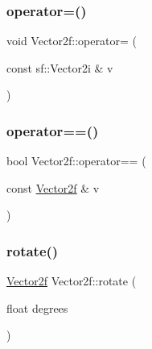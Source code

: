 \mbox{\label{class_vector2f_a194dd3ffa8e7a7c4aea0333b965e2582}} 
\subsubsection{\texorpdfstring{operator=()}{operator=()}\hspace{0.1cm}{\footnotesize\ttfamily [3/3]}}
{\footnotesize\ttfamily void Vector2f\+::operator= (\begin{DoxyParamCaption}\item[{const sf\+::\+Vector2i \&}]{v }\end{DoxyParamCaption})}

\mbox{\label{class_vector2f_acab2685261fbe7d471f4bf201d32d1c2}} 
\subsubsection{\texorpdfstring{operator==()}{operator==()}}
{\footnotesize\ttfamily bool Vector2f\+::operator== (\begin{DoxyParamCaption}\item[{const \mbox{\hyperlink{class_vector2f}{Vector2f}} \&}]{v }\end{DoxyParamCaption})}

\mbox{\label{class_vector2f_a39fb9f4a82e635628608541463a3cc62}} 
\subsubsection{\texorpdfstring{rotate()}{rotate()}}
{\footnotesize\ttfamily \mbox{\hyperlink{class_vector2f}{Vector2f}} Vector2f\+::rotate (\begin{DoxyParamCaption}\item[{float}]{degrees }\end{DoxyParamCaption})}

\mbox{\label{class_vector2f_adda2d2ca67f30230a77fe1faf0256688}} 
